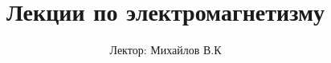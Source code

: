 \documentclass[12pt, a4paper, twoside]{book}
\title{Лекции по электромагнетизму}
\author{Лектор: Михайлов В.К}
\begin{document}
    \def\chaptername{Лекция} %
    \maketitle
    \tableofcontents
    
    
    
    
    
    
    
    
    
    
    
    
    
    
    
    
    
    
    
    
    
    
    
    
\end{document}
